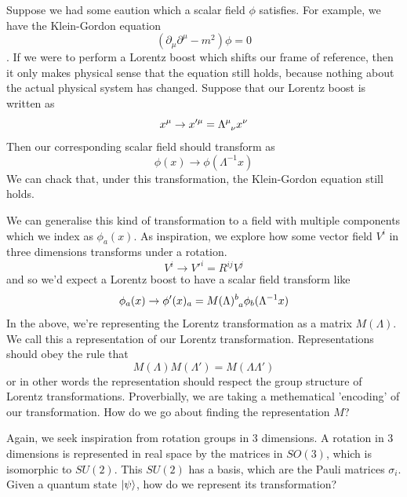 \documentclass[11pt, oneside]{article}   	%
\theoremstyle{newline}
\theoremstyle{newline}
\theoremstyle{newline}
\theoremstyle{newline}
\theoremstyle{newline}
\begin{document}
Suppose we had some eaution which a scalar field $\phi$ satisfies. For example, we have the Klein-Gordon equation 
\[ \left( \partial_\mu\partial^\mu - m^2 \right) \phi = 0 \]. If we were to perform a Lorentz boost which shifts our frame of reference, then it only makes physical sense that the equation still holds, because nothing about the actual physical system has changed. Suppose that our Lorentz boost is written as 
\[ x^\mu \rightarrow x'^\mu  = \Lambda\indices{^\mu_\nu}x^\nu \]
Then our corresponding scalar field should transform as 
\[ \phi(x) \rightarrow \phi(\Lambda^{-1} x) \] 
We can chack that, under this transformation, the Klein-Gordon equation still holds. 


We can generalise this kind of transformation to a field with multiple components which we index as $\phi_a(x) $. As inspiration, we explore how some vector field $V^i$ in three dimensions transforms under a rotation.
\[ 
V^i \rightarrow V'^i  = R^{ij}V^j 
\]
and so we'd expect a Lorentz boost to have a scalar field transform like 
\[
\phi_a(x) \rightarrow \phi'(x)_a = M(\Lambda)\indices{^b_a}\phi_b(\Lambda^{-1}x)
\] 
In the above, we're representing the Lorentz transformation as a matrix $M(\Lambda)$. We call this a representation of our Lorentz transformation. Representations should obey the rule that 
\[ M(\Lambda)M(\Lambda') = M(\Lambda \Lambda')\] or in other words the representation should respect the group structure of Lorentz transformations. Proverbially, we are taking a methematical 'encoding' of our transformation. How do we go about finding the representation $M$? 

Again, we seek inspiration from rotation groups in 3 dimensions. A rotation in 3 dimensions is represented in real space by the matrices in $SO(3)$, which is isomorphic to $SU(2)$. This $SU(2)$ has a basis, which are the Pauli matrices $\sigma_i$. Given a quantum state $\ket{\psi}$, how do we represent its transformation?
\end{document}
